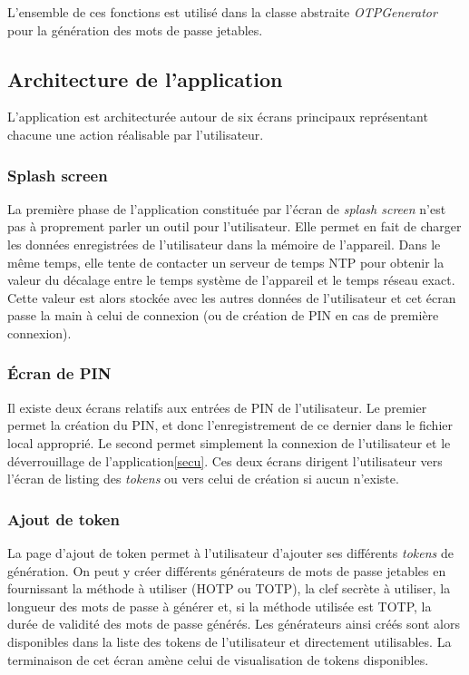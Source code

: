 L'ensemble de ces fonctions est utilisé dans la classe abstraite \emph{OTPGenerator} pour la
génération des mots de passe jetables.

\subsection{Architecture de l'application}

L'application est architecturée autour de six écrans principaux représentant chacune une
action réalisable par l'utilisateur.

\subsubsection{Splash screen}
La première phase de l'application constituée par l'écran de \emph{splash screen} n'est pas à
proprement parler un outil pour l'utilisateur. Elle permet en fait de charger les données enregistrées
de l'utilisateur dans la mémoire de l'appareil. Dans le même temps, elle tente de contacter un serveur
de temps NTP pour obtenir la valeur du décalage entre le temps système de l'appareil et le temps réseau
exact. Cette valeur est alors stockée avec les autres données de l'utilisateur et cet écran passe la
main à celui de connexion (ou de création de PIN en cas de première connexion).

\subsubsection{Écran de PIN}
Il existe deux écrans relatifs aux entrées de PIN de l'utilisateur. Le premier permet la création
du PIN, et donc l'enregistrement de ce dernier dans le fichier local approprié. Le second permet
simplement la connexion de l'utilisateur et le déverrouillage de l'application\ref{secu}. Ces deux
écrans dirigent l'utilisateur vers l'écran de listing des \emph{tokens} ou vers celui de création
si aucun n'existe.

\subsubsection{Ajout de token}
La page d'ajout de token permet à l'utilisateur d'ajouter ses différents \emph{tokens} de
génération. On peut y créer différents générateurs de mots de passe jetables en fournissant la
méthode à utiliser (HOTP ou TOTP), la clef secrète à utiliser, la longueur des mots de passe à
générer et, si la méthode utilisée est TOTP, la durée de validité des mots de passe générés. Les
générateurs ainsi créés sont alors disponibles dans la liste des tokens de l'utilisateur et
directement utilisables. La terminaison de cet écran amène celui de visualisation de tokens
disponibles.

